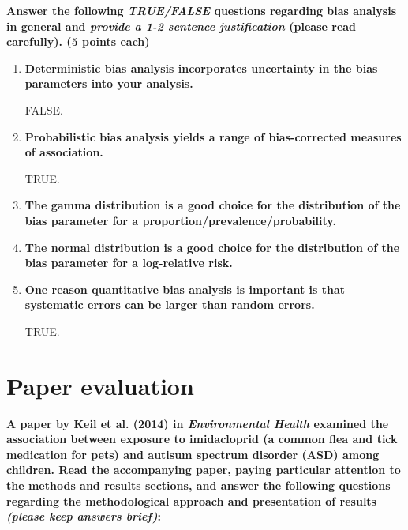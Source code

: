 \documentclass[
  11pt,
]{article}
\begin{document}
\textbf{Answer the following \textit{TRUE/FALSE} questions regarding bias analysis in general and \textit{provide a 1-2 sentence justification} (please read carefully). (5 points each)}

\begin{enumerate}[label=\textbf{\arabic*.}]
  \item \textbf{Deterministic bias analysis incorporates uncertainty in the bias parameters into your analysis.}

FALSE.

  \item \textbf{Probabilistic bias analysis yields a range of bias-corrected measures of association.}

TRUE.

  \item \textbf{The gamma distribution is a good choice for the distribution of the bias parameter for a proportion/prevalence/probability.}

  \item \textbf{The normal distribution is a good choice for the distribution of the bias parameter for a log-relative risk.}

  \item \textbf{One reason quantitative bias analysis is important is that systematic errors can be larger than random errors.}

TRUE.

\end{enumerate}

\newpage

\section{Paper evaluation}

\textbf{A paper by Keil et al. (2014) in \textit{Environmental Health} examined the association between exposure to imidacloprid (a common flea and tick medication for pets) and autisum spectrum disorder (ASD) among children. Read the accompanying paper, paying particular attention to the methods and results sections, and answer the following questions regarding the methodological approach and presentation of results \textit{(please keep answers brief)}:}
\end{document}
